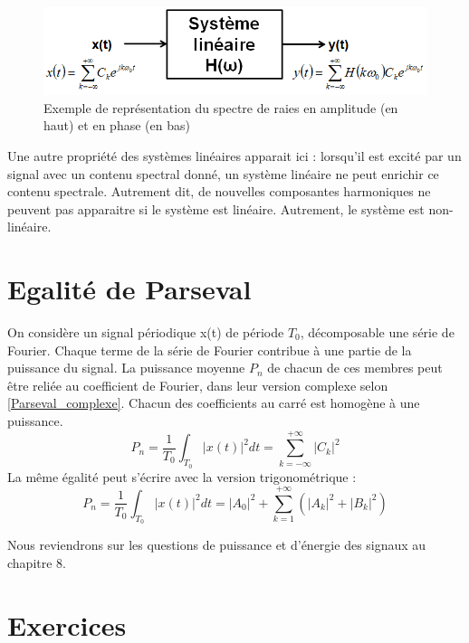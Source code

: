 	 \begin{figure}[h!]
	 	\centering
	 	\includegraphics[scale=0.6]{images/LTI_serie_Fourier.png}
	 	\caption{Exemple de représentation du spectre de raies en amplitude (en haut) et en phase (en bas)}	
	 	\label{Fig:Excitation d'un système linéaire par un signal périodique} 
	 \end{figure}
	 
	Une autre propriété des systèmes linéaires apparait ici : lorsqu'il est excité par un signal avec un contenu spectral donné, un système linéaire ne peut enrichir ce contenu spectrale. Autrement dit, de nouvelles composantes harmoniques ne peuvent pas apparaitre si le système est linéaire. Autrement, le système est non-linéaire.
	 
	 
	 
	
	\section{Egalité de Parseval}
	
	On considère un signal périodique x(t) de période $T_{0}$, décomposable  une série de Fourier. Chaque terme de la série de Fourier contribue à une partie de la puissance du signal. La puissance moyenne $P_{n}$ de chacun de ces membres peut être reliée au coefficient de Fourier, dans leur version complexe selon \ref{Parseval_complexe}. Chacun des coefficients au carré est homogène à une puissance.
	\begin{equation}\label{Parseval_complexe}
	P_{n}=\frac{1}{T_{0}}\int_{T_{0}}|x(t)|^{2}dt=\sum_{k=-\infty}^{+\infty}|C_k|^{2}
	\end{equation}
	La même égalité peut s'écrire avec la version trigonométrique : 
	\begin{equation}\label{Parseval_trigo}
	P_{n}=\frac{1}{T_{0}}\int_{T_{0}}|x(t)|^{2}dt=|A_0|^{2}+\sum_{k=1}^{+\infty}(|A_k|^{2}+|B_k|^{2})
	\end{equation}

	
	Nous reviendrons sur les questions de puissance et d'énergie des signaux au chapitre 8.\\
	
	
	\section{Exercices}
	
